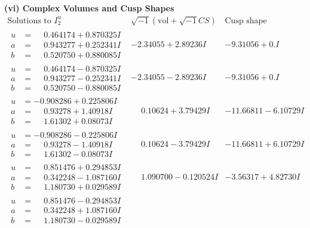 \documentclass[1p]{elsarticle_modified}
\theoremstyle{definition}
\newcommand{\I}{\sqrt{-1}}
\begin{document}
\newpage\flushleft \textbf{(vi) Complex Volumes and Cusp Shapes}
$$\begin{array}{c|c|c}  
\text{Solutions to }I^u_{2}& \I (\text{vol} + \sqrt{-1}CS) & \text{Cusp shape}\\
 \hline 
\begin{aligned}
u &= \phantom{-}0.464174 + 0.870325 I \\
a &= \phantom{-}0.943277 + 0.252341 I \\
b &= \phantom{-}0.520750 + 0.880085 I\end{aligned}
 & -2.34055 + 2.89236 I & -9.31056 + 0. I\phantom{ +0.000000I} \\ \hline\begin{aligned}
u &= \phantom{-}0.464174 - 0.870325 I \\
a &= \phantom{-}0.943277 - 0.252341 I \\
b &= \phantom{-}0.520750 - 0.880085 I\end{aligned}
 & -2.34055 - 2.89236 I & -9.31056 + 0. I\phantom{ +0.000000I} \\ \hline\begin{aligned}
u &= -0.908286 + 0.225806 I \\
a &= \phantom{-}0.93278 + 1.40918 I \\
b &= \phantom{-}1.61302 + 0.08073 I\end{aligned}
 & \phantom{-}0.10624 + 3.79429 I & -11.66811 - 6.10729 I \\ \hline\begin{aligned}
u &= -0.908286 - 0.225806 I \\
a &= \phantom{-}0.93278 - 1.40918 I \\
b &= \phantom{-}1.61302 - 0.08073 I\end{aligned}
 & \phantom{-}0.10624 - 3.79429 I & -11.66811 + 6.10729 I \\ \hline\begin{aligned}
u &= \phantom{-}0.851476 + 0.294853 I \\
a &= \phantom{-}0.342248 - 1.087160 I \\
b &= \phantom{-}1.180730 + 0.029589 I\end{aligned}
 & \phantom{-}1.090700 - 0.120524 I & -3.56317 + 4.82730 I \\ \hline\begin{aligned}
u &= \phantom{-}0.851476 - 0.294853 I \\
a &= \phantom{-}0.342248 + 1.087160 I \\
b &= \phantom{-}1.180730 - 0.029589 I\end{aligned}

\end{array}$$
\end{document}
